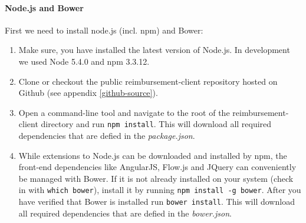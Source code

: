 \paragraph{Node.js and Bower}
First we need to install node.js (incl. npm) and Bower:
\begin{enumerate}
  \item Make sure, you have installed the latest version of Node.js. In development we used Node 5.4.0 and npm 3.3.12.
  \item Clone or checkout the public reimbursement-client repository hosted on Github (see appendix \ref{github-source}).
  \item Open a command-line tool and navigate to the root of the reimbursement-client directory and run \texttt{npm install}. This will download all required dependencies that are defied in the \textit{package.json}.
  \item While extensions to Node.js can be downloaded and installed by npm, the front-end dependencies like AngularJS, Flow.js and JQuery can conveniently be managed with Bower. If it is not already installed on your system (check in with \texttt{which bower}), install it by running \texttt{npm install -g bower}. After you have verified that Bower is installed run \texttt{bower install}. This will download all required dependencies that are defied in the \textit{bower.json}.
\end{enumerate}

